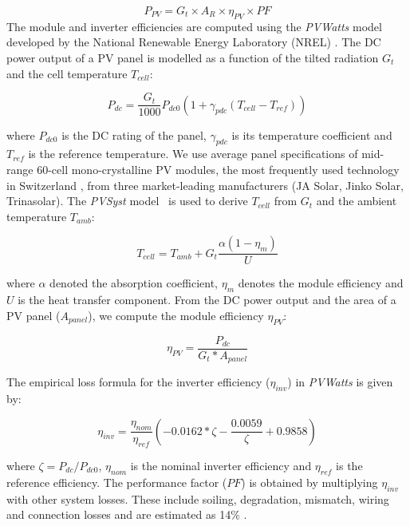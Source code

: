\begin{equation}
    P_{PV} = G_t \times A_R \times \eta_{PV} \times PF 
\end{equation}
The module and inverter efficiencies are computed using the \textit{PVWatts} model developed by the National Renewable Energy Laboratory (NREL) \cite{dobos_pvwatts_2014}. The DC power output of a PV panel is modelled as a function of the tilted radiation $G_t$ and the cell temperature $T_{cell}$:

\begin{equation}
\label{eq:Pdc}
    P_{dc} = \frac{G_{t}}{1000} P_{dc0} (1 + \gamma_{pdc}(T_{cell}-T_{ref}))
\end{equation}

where $P_{dc0}$ is the DC rating of the panel, $\gamma_{pdc}$ is its temperature coefficient and $T_{ref}$ is the reference temperature.
%
We use average panel specifications of mid-range 60-cell mono-crystalline PV modules, the most frequently used technology in Switzerland \cite{buffat_scalable_2018}, from three market-leading manufacturers (JA Solar, Jinko Solar, Trinasolar).
%
The \textit{PVSyst} model~\cite{faiman_assessing_2008} is used to derive $T_{cell}$ from $G_t$ and the ambient temperature $T_{amb}$:

\begin{equation}
    T_{cell} = T_{amb} + G_t \frac{\alpha (1 - \eta_m)}{U}
\end{equation}

where $\alpha$ denoted the absorption coefficient, $\eta_m$ denotes the module efficiency and $U$ is the heat transfer component. 
%
From the DC power output and the area of a PV panel ($A_{panel}$), we compute the module efficiency $\eta_{PV}$:

\begin{equation}
\label{eq:eff}
    \eta_{PV} = \frac{P_{dc}}{G_{t} * A_{panel} }
\end{equation}

The empirical loss formula for the inverter efficiency ($\eta_{inv}$) in \textit{PVWatts} is given by:

\begin{equation}
    \eta_{inv} = \frac{\eta_{nom}}{\eta_{ref}} \left( -0.0162 * \zeta - \frac{0.0059}{\zeta} + 0.9858 \right)
\end{equation}

where $\zeta = P_{dc}/P_{dc0}$, $\eta_{nom}$ is the nominal inverter efficiency and $\eta_{ref}$ is the reference efficiency. 
%
The performance factor ($PF$) is obtained by multiplying $\eta_{inv}$ with other system losses. These include soiling, degradation, mismatch, wiring and connection losses and are estimated as 14\% \cite{dobos_pvwatts_2014}. 

